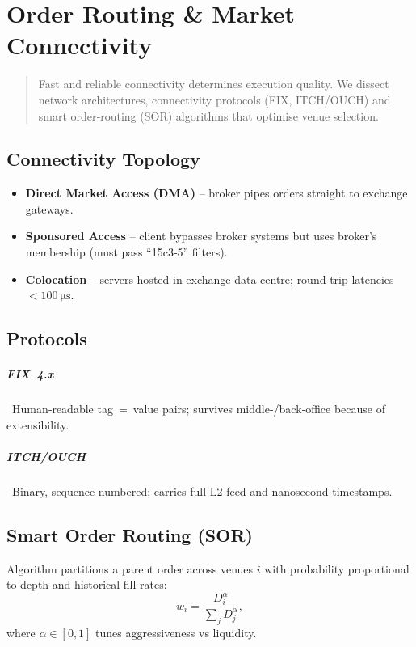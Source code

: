 \chapter{Order Routing \& Market Connectivity}\label{ch:orderrouting}

\begin{abstract}
Fast and reliable connectivity determines execution quality.  We dissect
network architectures, connectivity protocols (FIX, ITCH/OUCH) and smart
order‑routing (SOR) algorithms that optimise venue selection.
\end{abstract}

\section{Connectivity Topology}

\begin{itemize}
  \item \textbf{Direct Market Access (DMA)} – broker pipes orders straight
        to exchange gateways.
  \item \textbf{Sponsored Access} – client bypasses broker systems but
        uses broker’s membership (must pass “15c3‑5” filters).
  \item \textbf{Colocation} – servers hosted in exchange data centre;
        round‑trip latencies \(<\SI{100}{\micro\second}\).
\end{itemize}

\section{Protocols}

\paragraph{FIX 4.x} Human‑readable tag = value pairs; survives middle‑/back‑office because of extensibility.  
\paragraph{ITCH/OUCH} Binary, sequence‑numbered; carries full L2 feed and nanosecond timestamps.

\section{Smart Order Routing (SOR)}

Algorithm partitions a parent order across venues \(i\) with probability
proportional to depth and historical fill rates:
\[
w_i = \frac{D_i^{\alpha}}{\sum_j D_j^{\alpha}},
\]
where \(\alpha\in[0,1]\) tunes aggressiveness vs liquidity.

